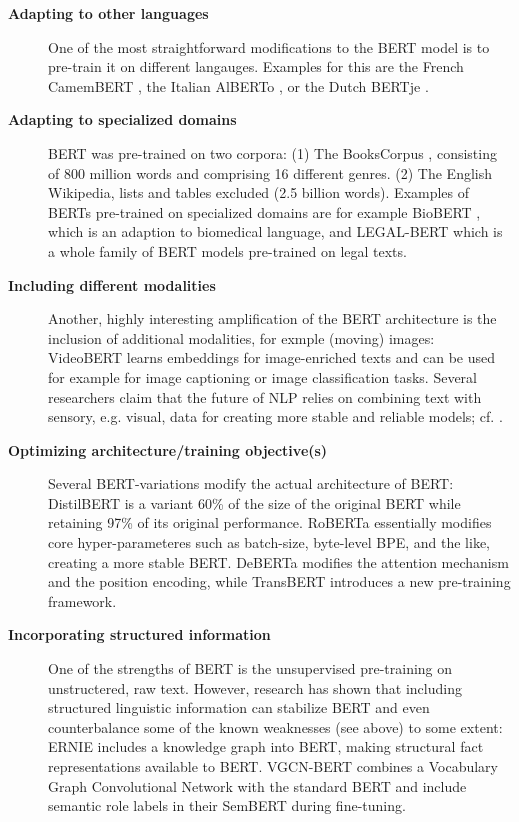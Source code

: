 \begin{description}
  \item[\textbf{Adapting to other languages}] One of the most straightforward modifications to the BERT model is to pre-train it on different langauges. Examples for this are the French CamemBERT \cite{martin2019camembert}, the Italian AlBERTo \cite{polignano2019alberto}, or the Dutch BERTje \cite{de2019bertje}.
  \item[\textbf{Adapting to specialized domains}] BERT was pre-trained on two corpora: (1) The BooksCorpus \citep{zhu2015aligning}, consisting of 800 million words and comprising 16 different genres. (2) The English Wikipedia, lists and tables excluded (2.5 billion words).
  Examples of BERTs pre-trained on specialized domains are for example BioBERT \cite{lee2020biobert}, which  is an adaption to biomedical language, and LEGAL-BERT \cite{chalkidis2020legalbert} which is a whole family of BERT models pre-trained on legal texts.
  \item[\textbf{Including different modalities}] Another, highly interesting amplification of the BERT architecture is the inclusion of additional modalities, for exmple (moving) images: VideoBERT \cite{sun2019videobert} learns embeddings for image-enriched texts and can be used for example for image captioning or image classification tasks.
  Several researchers claim that the future of NLP relies on combining text with sensory, e.g. visual, data for creating more stable and reliable models; cf. \citep{bisk2020experience, bender2021dangers}.
  \item[\textbf{Optimizing architecture/training objective(s)}] Several BERT-variations modify the actual architecture of BERT:  DistilBERT \cite{sanh2019distilbert} is a variant 60\% of the size of the original BERT while retaining 97\% of its original performance.
  RoBERTa \cite{liu2019roberta} essentially modifies core hyper-parameteres such as batch-size, byte-level BPE, and the like, creating a more stable BERT.
  DeBERTa \cite{he2020deberta} modifies the attention mechanism and the position encoding, while TransBERT \cite{li2021transbert} introduces a new pre-training framework.
  \item[\textbf{Incorporating structured information}] One of the strengths of BERT is the unsupervised pre-training on unstructered, raw text. However, research has shown that including structured linguistic information can stabilize BERT and even counterbalance some of the known weaknesses (see above) to some extent:
  ERNIE \cite{sun2019ernie} includes a knowledge graph into BERT, making structural fact representations available to BERT.
  VGCN-BERT \cite{lu2020vgcn} combines a Vocabulary Graph Convolutional Network with the standard BERT and \cite{zhang2019semantics} include semantic role labels in their SemBERT during fine-tuning.
\end{description}


